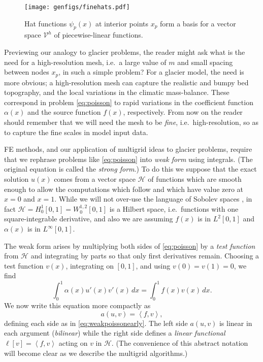 \documentclass[letterpaper,final,12pt,reqno]{amsart}
\theoremstyle{claim}
\newcommand{\ip}[2]{\left<#1,#2\right>}
\numberwithin{equation}{section}
\numberwithin{figure}{section}
\numberwithin{table}{section}
\numberwithin{theorem}{section}
\begin{document}
\begin{figure}
\texttt{[image: genfigs/finehats.pdf]}
\caption{Hat functions $\psi_p(x)$ at interior points $x_p$ form a basis for a vector space $\mathcal{V}^h$ of piecewise-linear functions.}
\label{fig:finehats}
\end{figure}

Previewing our analogy to glacier problems, the reader might ask what is the need for a high-resolution mesh, i.e.~a large value of $m$ and small spacing between nodes $x_p$, in such a simple problem?  For a glacier model, the need is more obvious; a high-resolution mesh can capture the realistic and bumpy bed topography, and the local variations in the climatic mass-balance.  These correspond in problem \eqref{eq:poisson} to rapid variations in the coefficient function $\alpha(x)$ and the source function $f(x)$, respectively.  From now on the reader should remember that we will need the mesh to be \emph{fine}, i.e.~high-resolution, so as to capture the fine scales in model input data.

FE methods, and our application of multigrid ideas to glacier problems, require that we rephrase problems like \eqref{eq:poisson} into \emph{weak form} using integrals.  (The original equation is called the \emph{strong form}.)  To do this we suppose that the exact solution $u(x)$ comes from a vector space $\mathcal{H}$ of functions which are smooth enough to allow the computations which follow and which have value zero at $x=0$ and $x=1$.  While we will not over-use the language of Sobolev spaces \cite[for example]{Evans2010}, in fact $\mathcal{H}=H_0^1[0,1]=W_0^{1,2}[0,1]$ is a Hilbert space, i.e.~functions with one square-integrable derivative, and also we are assuming $f(x)$ is in $L^2[0,1]$ and $\alpha(x)$ is in $L^\infty[0,1]$.

The weak form arises by multiplying both sides of \eqref{eq:poisson} by a \emph{test function} from $\mathcal{H}$ and integrating by parts so that only first derivatives remain.  Choosing a test function $v(x)$, integrating on $[0,1]$, and using $v(0)=v(1)=0$, we find
\begin{equation}
\int_0^1 \alpha(x) u'(x) v'(x)\,dx = \int_0^1 f(x) v(x)\, dx.  \label{eq:weakpoissonearly}
\end{equation}
We now write this equation more compactly as
\begin{equation}
  a(u,v) = \ip{f}{v}, \label{eq:weakpoisson}
\end{equation}
defining each side as in \eqref{eq:weakpoissonearly}.  The left side $a(u,v)$ is linear in each argument (\emph{bilinear}) while the right side defines a \emph{linear functional} $\ell[v] = \ip{f}{v}$ acting on $v$ in $\mathcal{H}$.  (The convenience of this abstract notation will become clear as we describe the multigrid algorithms.)
\end{document}

